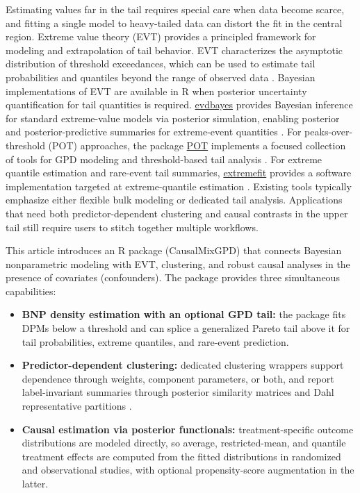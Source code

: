 \documentclass[article]{jss}\usepackage[]{graphicx}\usepackage[]{xcolor}
\DeclareRobustCommand{\pkg}[1]{\textsf{#1}}
\begin{document}
Estimating values far in the tail requires special care when data become
scarce, and fitting a single model to heavy-tailed data can distort the
fit in the central region. Extreme value theory (EVT) provides a
principled framework for modeling and extrapolation of tail behavior.
EVT characterizes the asymptotic distribution of
threshold exceedances, which can be used to estimate tail probabilities
and quantiles beyond the range of observed data
\citep{BalkemaDeHaan1974,Pickands1975,Coles2001}. Bayesian
implementations of EVT are available in \textsf{R} when posterior
uncertainty quantification for tail quantities is required.
\href{https://cran.r-project.org/package=evdbayes}{\textsf{evdbayes}}
provides Bayesian inference for standard extreme-value models via
posterior simulation, enabling posterior and posterior-predictive
summaries for extreme-event quantities \citep{evdbayes_pkg}. For
peaks-over-threshold (POT) approaches, the package
\href{https://cran.r-project.org/package=POT}{\textsf{POT}} implements
a focused collection of tools for GPD modeling and threshold-based tail
analysis \citep{POT_pkg}. For extreme quantile estimation and rare-event
tail summaries,
\href{https://cran.r-project.org/package=extremefit}{\textsf{extremefit}}
provides a software implementation targeted at extreme-quantile
estimation \citep{durrieu2018extremefit}. Existing tools typically
emphasize either flexible bulk modeling or dedicated tail analysis.
Applications that need both predictor-dependent clustering and causal
contrasts in the upper tail still require users to stitch together
multiple workflows.

This article introduces an \textsf{R} package (\pkg{CausalMixGPD}) that
connects Bayesian nonparametric modeling with EVT, clustering,
and robust causal analyses in the presence of covariates (confounders).
The package provides three simultaneous capabilities:

\begin{itemize}
  \item[(i)] \textbf{BNP density estimation with an optional GPD tail:}
  the package fits DPMs below a threshold and can splice a generalized
  Pareto tail above it for tail probabilities, extreme quantiles, and
  rare-event prediction.
  \item[(ii)] \textbf{Predictor-dependent clustering:} dedicated
  clustering wrappers support dependence through weights, component
  parameters, or both, and report label-invariant summaries through
  posterior similarity matrices and Dahl representative partitions
  \citep{Binder1978,Dahl2006}.
  \item[(iii)] \textbf{Causal estimation via posterior functionals:}
  treatment-specific outcome distributions are modeled directly, so
  average, restricted-mean, and quantile treatment effects are computed
  from the fitted distributions in randomized and observational studies,
  with optional propensity-score augmentation in the latter.
 \end{itemize}
\end{document}
